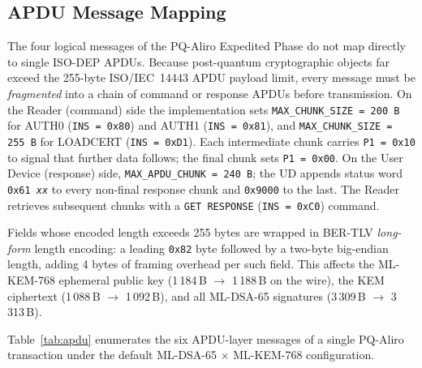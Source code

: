\subsection{APDU Message Mapping}
\label{sec:apdu-mapping}

The four logical messages of the PQ-Aliro Expedited Phase do not map directly
to single ISO-DEP APDUs.  Because post-quantum cryptographic objects far exceed
the 255-byte ISO/IEC~14443 APDU payload limit, every message must be
\emph{fragmented} into a chain of command or response APDUs before transmission.
On the Reader (command) side the implementation sets
\texttt{MAX\_CHUNK\_SIZE = 200\,B} for AUTH0 (\texttt{INS = 0x80}) and AUTH1
(\texttt{INS = 0x81}), and \texttt{MAX\_CHUNK\_SIZE = 255\,B} for LOADCERT
(\texttt{INS = 0xD1}).
Each intermediate chunk carries \texttt{P1 = 0x10} to signal that further data
follows; the final chunk sets \texttt{P1 = 0x00}.
On the User Device (response) side, \texttt{MAX\_APDU\_CHUNK = 240\,B}; the UD
appends status word \texttt{0x61\,\textit{xx}} to every non-final response chunk
and \texttt{0x9000} to the last.
The Reader retrieves subsequent chunks with a \texttt{GET RESPONSE}
(\texttt{INS = 0xC0}) command.

Fields whose encoded length exceeds 255 bytes are wrapped in BER-TLV
\emph{long-form} length encoding: a leading \texttt{0x82} byte followed by a
two-byte big-endian length, adding 4 bytes of framing overhead per such field.
This affects the ML-KEM-768 ephemeral public key (1\,184\,B $\to$ 1\,188\,B
on the wire), the KEM ciphertext (1\,088\,B $\to$ 1\,092\,B), and all
ML-DSA-65 signatures (3\,309\,B $\to$ 3\,313\,B).

Table~\ref{tab:apdu} enumerates the six APDU-layer messages of a single
PQ-Aliro transaction under the default ML-DSA-65 $\times$ ML-KEM-768
configuration.

